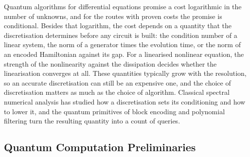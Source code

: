 %

Quantum algorithms for differential equations promise a cost logarithmic in the number of unknowns, and for the routes with proven costs the promise is conditional. Besides that logarithm, the cost depends on a quantity that the discretisation determines before any circuit is built: the condition number of a linear system, the norm of a generator times the evolution time, or the norm of an encoded Hamiltonian against its gap. For a linearised nonlinear equation, the strength of the nonlinearity against the dissipation decides whether the linearisation converges at all. These quantities typically grow with the resolution, so an accurate discretisation can still be an expensive one, and the choice of discretisation matters as much as the choice of algorithm. Classical spectral numerical analysis has studied how a discretisation sets its conditioning and how to lower it, and the quantum primitives of block encoding and polynomial filtering turn the resulting quantity into a count of queries.

\subsection{Quantum Computation Preliminaries}
\label{sec:bg-qc}

